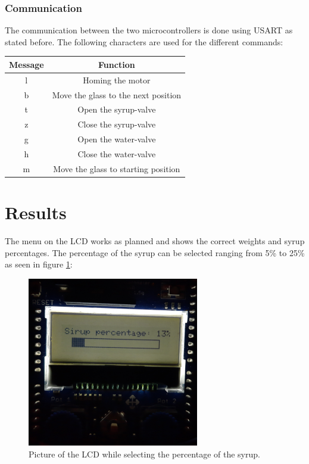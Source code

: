 \documentclass[twocolumn]{article}
\begin{document}
	\subsubsection{Communication}  \label{sec:comm}
	
	The communication between the two microcontrollers is done using USART as stated before. The following characters are used for the different commands: \newline\newline
	\begin{tabular}{|c|c|}
		\hline
		Message & Function \\ 
		\hline\hline 
		l &  Homing the motor\\ 
		\hline 
		b & Move the glass to the next position\\ 
		\hline 
		t&  Open the syrup-valve\\ 
		\hline 
		z&  Close the syrup-valve\\ 
		\hline 
		g& Open the water-valve \\ 
		\hline 
		h& Close the water-valve \\ 
	\hline 
		m& Move the glass to starting position \\ 
	\hline 
	\end{tabular} 
	
	\vspace*{5px}	
	
	
	\section{Results}
	The menu on the LCD works as planned and shows the correct weights and syrup percentages. The percentage of the syrup can be selected ranging from 5\% to 25\% as seen in figure \ref{fig5}:
	
	\begin{figure}[H]
		\centering
		\includegraphics[width=75mm]{lcd.jpg}
		\caption{Picture of the LCD while selecting the percentage of the syrup.}
		\label{fig5}
	\end{figure}
	
\end{document}
